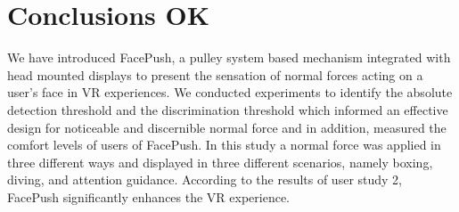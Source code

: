 \chapter{Conclusions OK} \label{chapter:conclusion}

We have introduced FacePush, a pulley system based mechanism integrated with head mounted displays to present the sensation of normal forces acting on a user's face in VR experiences. We conducted experiments to identify the absolute detection threshold and the discrimination threshold which informed an effective design for noticeable and discernible normal force and in addition, measured the comfort levels of users of FacePush. In this study a normal force was applied in three different ways and displayed in three different scenarios, namely boxing, diving, and attention guidance. According to the results of user study 2, FacePush significantly enhances the VR experience. 